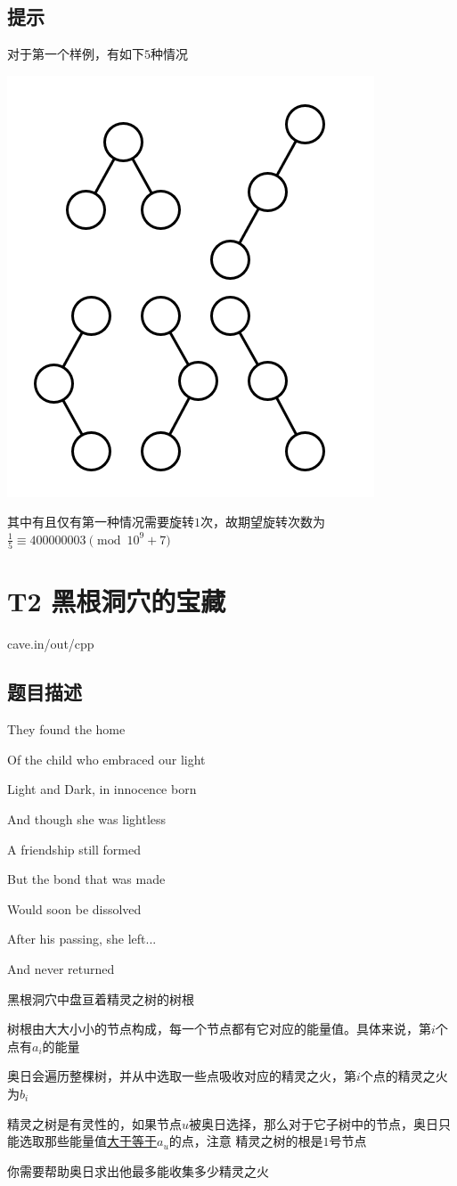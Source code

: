 \documentclass[12pt]{article}
\begin{document}
    \subsection{提示}
    对于第一个样例，有如下$5$种情况\par
    \centerline{\includegraphics{hint.png}}\par
    其中有且仅有第一种情况需要旋转$1$次，故期望旋转次数为$\frac{1}{5}\equiv400000003\pmod {10^9+7}$\newpage
    \section{T2 黑根洞穴的宝藏}
    cave.in/out/cpp
    \subsection{题目描述}
    They found the home\par
    Of the child who embraced our light\par
    Light and Dark, in innocence born\par
    And though she was lightless\par
    A friendship still formed\par
    But the bond that was made\par
    Would soon be dissolved\par
    After his passing, she left...\par
    And never returned\par
    黑根洞穴中盘亘着精灵之树的树根\par
    树根由大大小小的节点构成，每一个节点都有它对应的能量值。具体来说，第$i$个点有$a_i$的能量\par
    奥日会遍历整棵树，并从中选取一些点吸收对应的精灵之火，第$i$个点的精灵之火为$b_i$\par
    精灵之树是有灵性的，如果节点$u$被奥日选择，那么对于它子树中的节点，奥日只能选取那些能量值\underline{大于等于}$a_u$的点，注意
    精灵之树的根是$1$号节点\par
    你需要帮助奥日求出他最多能收集多少精灵之火\par
\end{document}
